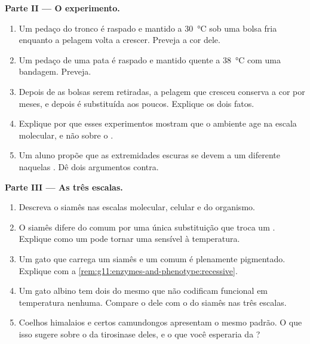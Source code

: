 \begin{problem}
\medskip
\noindent\textbf{Parte II --- O experimento.}
\begin{enumerate}[resume]
  \item Um pedaço do tronco é raspado e mantido a \qty{30}{\celsius}
        sob uma bolsa fria enquanto a pelagem volta a crescer. Preveja
        a cor dele.
  \item Um pedaço de uma pata é raspado e mantido quente a
        \qty{38}{\celsius} com uma bandagem. Preveja.
  \item Depois de as bolsas serem retiradas, a pelagem que cresceu
        conserva a cor por meses, e depois é substituída aos poucos.
        Explique os dois fatos.
  \item Explique por que esses experimentos mostram que o ambiente age
        na escala molecular, e não sobre o .
  \item Um aluno propõe que as extremidades escuras se devem a um
         diferente naquelas . Dê dois argumentos contra.
\end{enumerate}

\medskip
\noindent\textbf{Parte III --- As três escalas.}
\begin{enumerate}[resume]
  \item Descreva o  siamês nas escalas molecular, celular e do
        organismo.
  \item O  siamês difere do comum por uma única substituição que
        troca um . Explique como um  pode tornar
        uma  sensível à temperatura.
  \item Um gato que carrega um  siamês e um  comum é
        plenamente pigmentado. Explique com a
        \cref{rem:g11:enzymes-and-phenotype:recessive}.
  \item Um gato albino tem dois  do mesmo  que não codificam
         funcional em temperatura nenhuma. Compare o 
        dele com o do siamês nas três escalas.
  \item Coelhos himalaios e certos camundongos apresentam o mesmo
        padrão. O que isso sugere sobre o  da tirosinase deles, e o
        que você esperaria da ?
\end{enumerate}


\end{problem}
